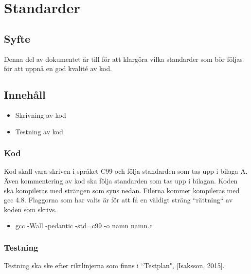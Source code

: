 \section{Standarder}

\subsection{Syfte}
Denna del av dokumentet är till för att klargöra vilka standarder som bör följas för att uppnå en god kvalité av kod.

\subsection{Innehåll}
\begin{itemize}
\item Skrivning av kod
\item Testning av kod
\end{itemize}

\subsubsection{Kod}
Kod skall vara skriven i språket C99 och följa standarden som tas upp i bilaga A. Även kommentering av kod ska följa standarden som tas upp i bilagan. 
\newline
\newline
Koden ska kompileras med strängen som syns nedan. Filerna kommer kompileras med gcc 4.8. Flaggorna som har valts är för att få en väldigt sträng ``rättning`` av koden som skrivs. 

\begin{itemize}
\item gcc -Wall -pedantic -std=c99 -o namn namn.c
\end{itemize}

\subsubsection{Testning}
Testning ska ske efter riktlinjerna som finns i ``Testplan", [Isaksson, 2015]. 
